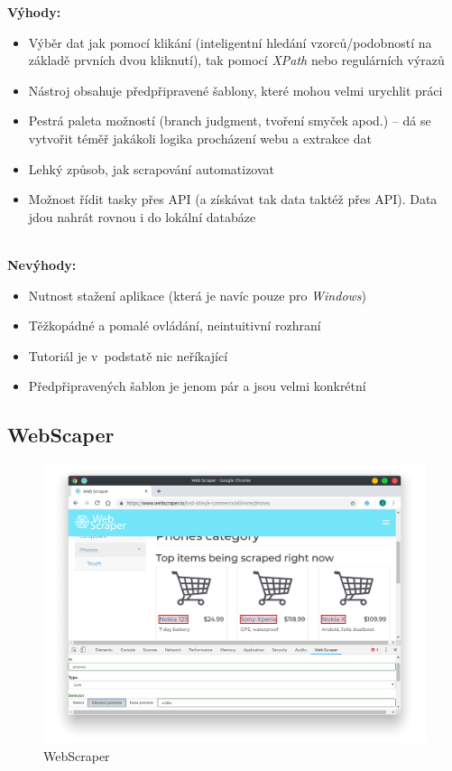 \documentclass[thesis=B,czech]{FITthesis}[2012/06/26]
\begin{document}
\textbf{Výhody:}
\begin{itemize}
	\item Výběr dat jak pomocí klikání (inteligentní hledání vzorců/podobností na základě prvních dvou kliknutí), tak pomocí \emph{XPath} nebo regulárních výrazů
	\item Nástroj obsahuje předpřipravené šablony, které mohou velmi urychlit práci
	\item Pestrá paleta možností (branch judgment, tvoření smyček apod.) -- dá se vytvořit téměř jakákoli logika procházení webu a extrakce dat
	\item Lehký způsob, jak scrapování automatizovat
	\item Možnost řídit tasky přes API (a získávat tak data taktéž přes API). Data jdou nahrát rovnou i do lokální databáze\\\\
\end{itemize}

\textbf{Nevýhody:}
\begin{itemize}
	\item Nutnost stažení aplikace (která je navíc pouze pro \emph{Windows})
	\item Těžkopádné a pomalé ovládání, neintuitivní rozhraní
	\item Tutoriál je v~podstatě nic neříkající
	\item Předpřipravených šablon je jenom pár a jsou velmi konkrétní
\end{itemize}


\newpage
\subsection{WebScaper}
\begin{figure}[h]
	\includegraphics[width=\linewidth]{images/WebScraper.png}
	\caption{WebScraper}
	\label{fig:webScraper}
\end{figure}
\end{document}
